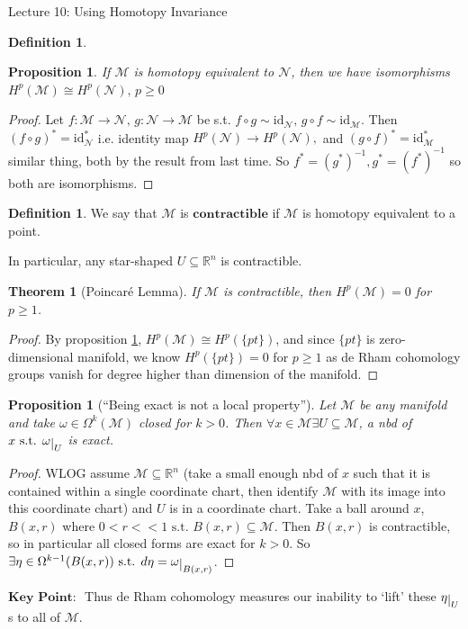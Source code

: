 \documentclass[10pt]{article}
\theoremstyle{plain}
\newtheorem{theorem}{Theorem}[section]
\newtheorem{prop}[thm]{Proposition}
\theoremstyle{definition}
\newtheorem{defn}[thm]{Definition} %
\newcommand{\st}{\text{ s.t. }}
\newcommand{\KeyPoint}{\textbf{Key Point: }}
\newcommand{\id}{\text{id}}
\newcommand{\Real}{\mathbb{R}}
\newcommand{\man}{\mathcal{M}}
\newcommand{\nan}{\mathcal{N}}
\newcommand{\xman}{x\in\man}
\newcommand{\pformman}[1]{\Omega^{#1}(\man)}
\newcommand{\deriv}{d}
\newcommand{\deta}{\deriv\eta}
\def\restrict#1{\raise-.5ex\hbox{\ensuremath|}_{#1}}
\newcommand{\cohomman}[1]{H^{#1}(\man)}
\newcommand{\cohomnan}[1]{H^{#1}(\nan)}
\begin{document}
\begin{section}{Lecture 10: Using Homotopy Invariance}
\begin{defn}
\end{defn}
\begin{prop}\label{prop:homotopyequivalenceimpliescohomologyequivalence}
If $\man $ is homotopy equivalent to $\nan$, then we have isomorphisms $\cohomman{p} \cong \cohomnan{p}, \, p\geq 0$
\end{prop}
\begin{proof}
Let $f: \man \to \nan, \, g:\nan\to \man $ be s.t. $f\circ g \sim \id _{\nan}, \, g\circ f \sim \id_{\man}$. Then $(f\circ g)^* = \id_\nan^*$ i.e. identity map $\cohomnan{p} \to \cohomnan{p},$ and $(g\circ f)^* = \id_\man^*$ similar thing, both by the result from last time. So $f^* = (g^*)^{-1}, g^* = (f^*)^{-1}$ so both are isomorphisms.
\end{proof}
\begin{defn}
We say that $\man$ is $\textbf{contractible}$ if $\man$ is homotopy equivalent to a point.
\end{defn}\noindent
In particular, any star-shaped $U \subseteq \Real^n$ is contractible.
\begin{theorem}[Poincaré Lemma]
If $\man$ is contractible, then $\cohomman{p} = 0 $ for $p\geq 1$.
\end{theorem}
\begin{proof}
By proposition \ref{prop:homotopyequivalenceimpliescohomologyequivalence}, $\cohomman{p} \cong H^p(\{{pt}\})$, and since $\{pt\}$ is zero-dimensional manifold, we know $H^p(\{pt\}) = 0$ for $p\geq 1$ as de Rham cohomology groups vanish for degree higher than dimension of the manifold.
\end{proof}
\begin{prop}[``Being exact is not a local property'']
Let $\man$ be any manifold and take $\omega \in \pformman{k}$ closed for $k> 0$. Then $\forall \xman \exists U \subseteq\man $, a nbd of $x \st \omega\restrict{U}$ is exact. 
\end{prop}
\begin{proof}
WLOG assume $\man \subseteq \Real^n$ (take a small enough nbd of $x$ such that it is contained within a single coordinate chart, then identify $\man$ with its image into this coordinate chart) and $U$ is in a coordinate chart. Take a ball around $x$, $B(x,r)$ where $0<r<<1 \st B(x,r) \subseteq \man.$ Then $B(x,r)$ is contractible, so in particular all closed forms are exact for $k>0$. So $\exists \eta \in \Omega^{k-1}(B(x,r)) \st \deta =\omega\restrict{B(x,r)}$.
\end{proof}\noindent
$\KeyPoint$ Thus de Rham cohomology measures our inability to `lift' these $\eta\restrict{U}$s to all of $\man$.\\

\end{section}
\end{document}
